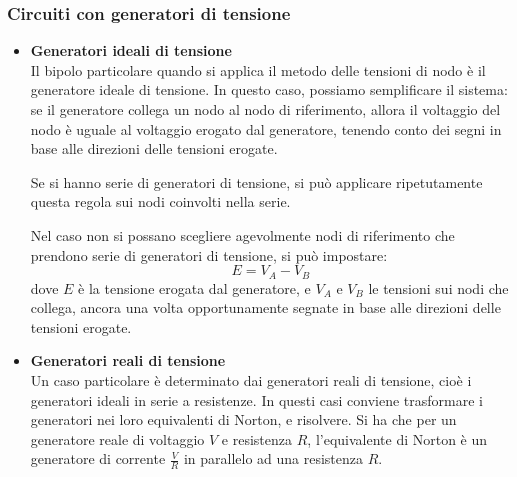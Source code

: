 \documentclass[a4paper,11pt]{article}
\begin{document}
\subsubsection{Circuiti con generatori di tensione}
\begin{itemize}
	\item \textbf{\textsf{Generatori ideali di tensione}} \\
Il bipolo particolare quando si applica il metodo delle tensioni di nodo è il generatore ideale di tensione.
In questo caso, possiamo semplificare il sistema: se il generatore collega un nodo al nodo di riferimento, allora il voltaggio del nodo è uguale al voltaggio erogato dal generatore, tenendo conto dei segni in base alle direzioni delle tensioni erogate.

Se si hanno serie di generatori di tensione, si può applicare ripetutamente questa regola sui nodi coinvolti nella serie.

Nel caso non si possano scegliere agevolmente nodi di riferimento che prendono serie di generatori di tensione, si può impostare:
$$ E = V_A - V_B $$
dove $E$ è la tensione erogata dal generatore, e $V_A$ e $V_B$ le tensioni sui nodi che collega, ancora una volta opportunamente segnate in base alle direzioni delle tensioni erogate.
	\item \textbf{\textsf{Generatori reali di tensione}} \\
Un caso particolare è determinato dai generatori reali di tensione, cioè i generatori ideali in serie a resistenze.
In questi casi conviene trasformare i generatori nei loro equivalenti di Norton, e risolvere.
Si ha che per un generatore reale di voltaggio $V$ e resistenza $R$, l'equivalente di Norton è un generatore di corrente $\frac{V}{R}$ in parallelo ad una resistenza $R$.
\end{itemize}

\TODO
\end{document}
